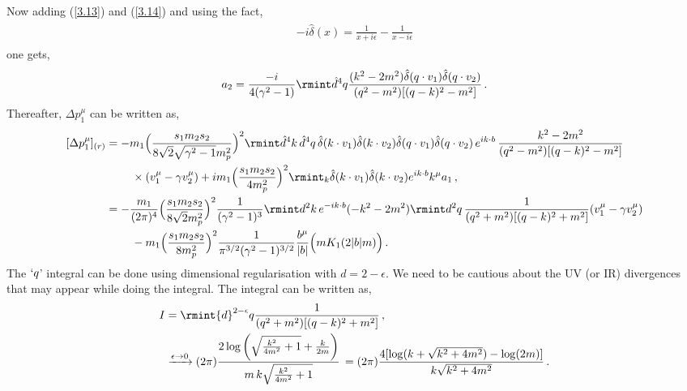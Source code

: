 Now adding (\ref{3.13}) and (\ref{3.14}) and using the fact,
\begin{align}
    \begin{split}
       - i\hat \delta(x)=\frac{1}{x+i\epsilon}-\frac{1}{x-i\epsilon}
    \end{split}
\end{align}
one gets,
\begin{align}
    \begin{split}
        a_2=\frac{-i}{4(\gamma^2-1)}\rmint \hat d^4 q \frac{(k^2-2m^2)\hat\delta(q\cdot v_1)\hat\delta(q\cdot v_2)}{(q^2-m^2)[(q-k)^2-m^2]}\,.
    \end{split}
\end{align}
Thereafter, $\Delta p_1^{\mu}$ can be written as,
\begin{align}
    \begin{split}
         \hspace{0cm}[\Delta p_1^{\mu}]_{(r)} &= -m_1\Big(\frac{s_1m_2 s_2}{8\sqrt{2}\sqrt{\gamma^2-1}m_p^2}\Big)^2\rmint \hat d^4 k\,\hat d^4 q\,\hat\delta(k\cdot v_1)\hat\delta(k\cdot v_2)\hat\delta(q\cdot v_1)\hat\delta(q\cdot v_2)\,e^{i k\cdot b}\,\frac{k^2-2m^2}{(q^2-m^2)[(q-k)^2-m^2]}\\ &
\hspace{0.8cm}\times (v_1^{\mu}-\gamma v_2^{\mu})+im_1\Big(\frac{s_1m_2 s_2}{4m_p^2}\Big)^2\rmint_{k}\hat\delta(k\cdot v_1)\hat\delta(k\cdot v_2)e^{ik\cdot b}k^{\mu}a_1\,,
         \\&
        =-\frac{m_1}{(2\pi)^4}\Big(\frac{s_1m_2 s_2}{8\sqrt{2}m_p^2}\Big)^2\frac{1}{(\gamma^2-1)^3}\rmint  d^2 k\,e^{-ik\cdot b}(-k^2-2m^2)\rmint  d^2 q\,\frac{1}{(q^2+m^2)[(q-k)^2+m^2]}(v_1^{\mu}-\gamma v_2^{\mu})\\ &
      \hspace{0.8cm}  -m_1\Big(\frac{s_1m_2 s_2}{8m_p^2}\Big)^2\frac{1}{\pi^{3/2}(\gamma^2-1)^{3/2}} \frac{b^\mu}{|b|}\Big(m K_1(2 |b| m)\Big)
        \,.
    \end{split}
\end{align}
The $`q$' integral can be done using dimensional regularisation with $d=2-\epsilon$. We need to be cautious about the UV (or IR) divergences that may appear while doing the integral. The integral can be written as,
\begin{align}
    \begin{split}
      I&=  \rmint {d}^{2-\epsilon}q \frac{1}{(q^2+m^2)[(q-k)^2+m^2]}\,,
      \\ &
       \xrightarrow[]{\epsilon \rightarrow 0} (2\pi)\frac{2 \log \left(\sqrt{\frac{k^2}{4 m^2}+1}+\frac{k}{2 m}\right)}{m\,k  \sqrt{\frac{k^2}{4 m^2}+1}}\,=(2\pi)\frac{4[\log(k+\sqrt{k^2+4m^2})-\log(2m)]}{k\sqrt{k^2+4m^2}}\,.
    \end{split}
\end{align}
